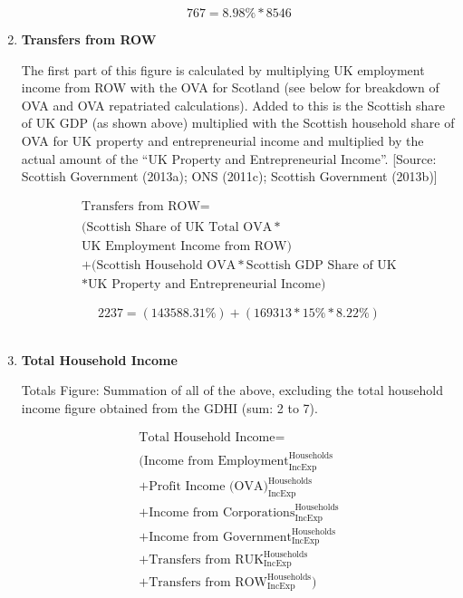 \begin{enumerate}
\begin{equation}\nonumber
767=8.98\%*8546
\end{equation}


\item \textbf {Transfers from ROW}

The first part of this figure is calculated by multiplying UK employment income from ROW with the OVA for Scotland (see below for breakdown of OVA and OVA repatriated calculations). Added to this is the Scottish share of UK GDP (as shown above) multiplied with the Scottish household share of OVA for UK property and entrepreneurial income and multiplied by the actual amount of the “UK Property and Entrepreneurial Income”. [Source: Scottish Government (2013a); ONS (2011c); Scottish Government (2013b)]

\begin{equation}
\begin{split}
\text{Transfers from ROW} =  \\ \\
(\text{Scottish Share of UK Total OVA}*\\
\text{UK Employment Income from ROW})\\
+(\text{Scottish Household OVA}*\text{Scottish GDP Share of UK}\\
*\text{UK Property and Entrepreneurial Income})
\end{split} \label{eq:2.5.11}
\end{equation}


\begin{equation} \nonumber
2237 = (143588.31\%)+(169313*15\%*8.22\%)
\end{equation}\\

\item \textbf {Total Household Income}

Totals Figure: Summation of all of the above, excluding the total household income figure obtained from the GDHI (sum: 2 to 7).

\begin{equation}
\begin{split}
\text{Total Household Income} =  \\ \\
(\text{Income from Employment}^\text{Households}_\text{IncExp}\\
+\text{Profit Income (OVA)}^\text{Households}_\text{IncExp}\\
+\text{Income from Corporations}^\text{Households}_\text{IncExp}\\
+\text{Income from Government}^\text{Households}_\text{IncExp}\\
+\text{Transfers from RUK}^\text{Households}_\text{IncExp}\\
+\text{Transfers from ROW}^\text{Households}_\text{IncExp})
\end{split} \label{eq:2.5.12}
\end{equation}


\end{enumerate}
